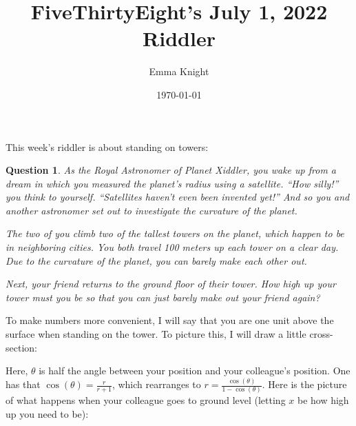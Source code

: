 \documentclass[11pt]{article}
\title{FiveThirtyEight's July 1, 2022 Riddler}
\author{Emma Knight}
\date{\today}
\newtheorem{question}[theorem]{Question}
\theoremstyle{definition}
\begin{document}
\maketitle
This week's riddler is about standing on towers:
\begin{question}
As the Royal Astronomer of Planet Xiddler, you wake up from a dream in which you measured the planet’s radius using a satellite. ``How silly!'' you think to yourself. ``Satellites haven’t even been invented yet!'' And so you and another astronomer set out to investigate the curvature of the planet.

The two of you climb two of the tallest towers on the planet, which happen to be in neighboring cities. You both travel 100 meters up each tower on a clear day. Due to the curvature of the planet, you can barely make each other out.

Next, your friend returns to the ground floor of their tower. How high up your tower must you be so that you can just barely make out your friend again?
\end{question}
To make numbers more convenient, I will say that you are one unit above the surface when standing on the tower.  To picture this, I will draw a little cross-section:


Here, $\theta$ is half the angle between your position and your colleague's position.  One has that $\cos(\theta) = \frac{r}{r+1}$, which rearranges to $r = \frac{\cos(\theta)}{1-\cos(\theta)}$.  Here is the picture of what happens when your colleague goes to ground level (letting $x$ be how high up you need to be):

\end{document}
